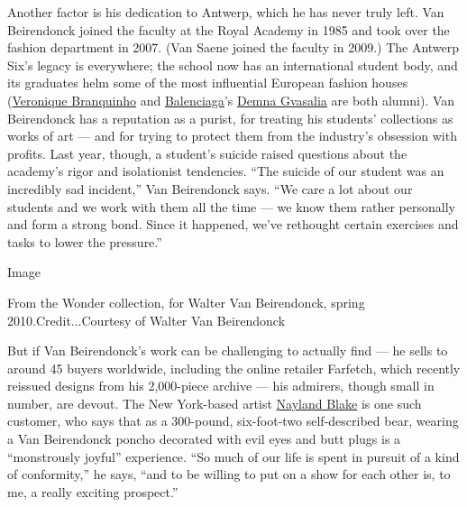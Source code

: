 Another factor is his dedication to Antwerp, which he has never truly
left. Van Beirendonck joined the faculty at the Royal Academy in 1985
and took over the fashion department in 2007. (Van Saene joined the
faculty in 2009.) The Antwerp Six's legacy is everywhere; the school now
has an international student body, and its graduates helm some of the
most influential European fashion houses
(\href{https://www.veroniquebranquinho.com/}{Veronique Branquinho} and
\href{https://www.nytimes3xbfgragh.onion/2017/06/14/t-magazine/fashion/balenciaga-how-to-wear.html}{Balenciaga}'s
\href{https://www.nytimes3xbfgragh.onion/2016/04/11/t-magazine/gucci-alessandro-michele-balenciaga-vetements-demna-gvasalia.html}{Demna
Gvasalia} are both alumni). Van Beirendonck has a reputation as a
purist, for treating his students' collections as works of art --- and
for trying to protect them from the industry's obsession with profits.
Last year, though, a student's suicide raised questions about the
academy's rigor and isolationist tendencies. ``The suicide of our
student was an incredibly sad incident,'' Van Beirendonck says. ``We
care a lot about our students and we work with them all the time --- we
know them rather personally and form a strong bond. Since it happened,
we've rethought certain exercises and tasks to lower the pressure.''

Image

From the Wonder collection, for Walter Van Beirendonck, spring
2010.Credit...Courtesy of Walter Van Beirendonck

But if Van Beirendonck's work can be challenging to actually find --- he
sells to around 45 buyers worldwide, including the online retailer
Farfetch, which recently reissued designs from his 2,000-piece archive
--- his admirers, though small in number, are devout. The New York-based
artist \href{http://www.naylandblake.net/}{Nayland Blake} is one such
customer, who says that as a 300-pound, six-foot-two self-described
bear, wearing a Van Beirendonck poncho decorated with evil eyes and butt
plugs is a ``monstrously joyful'' experience. ``So much of our life is
spent in pursuit of a kind of conformity,'' he says, ``and to be willing
to put on a show for each other is, to me, a really exciting prospect.''


